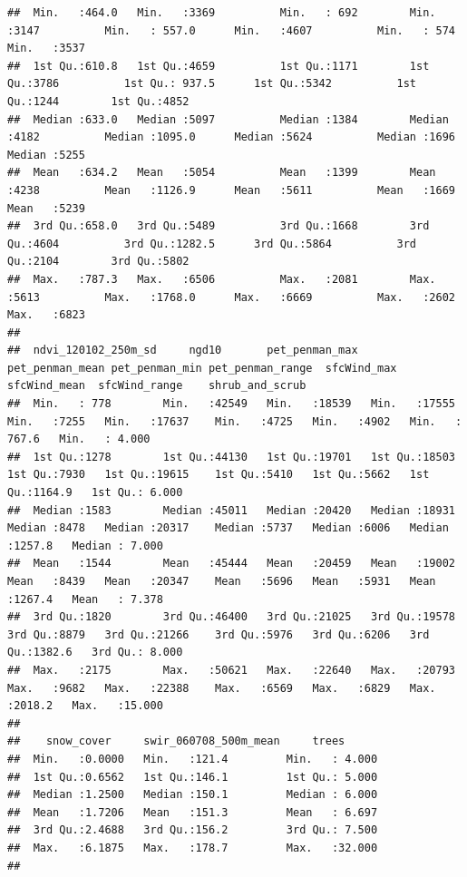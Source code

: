 \documentclass[
  10pt,
  b5paper,
  oneside]{book}
\begin{document}
\begin{verbatim}
##  Min.   :464.0   Min.   :3369          Min.   : 692        Min.   :3147          Min.   : 557.0      Min.   :4607          Min.   : 574        Min.   :3537         
##  1st Qu.:610.8   1st Qu.:4659          1st Qu.:1171        1st Qu.:3786          1st Qu.: 937.5      1st Qu.:5342          1st Qu.:1244        1st Qu.:4852         
##  Median :633.0   Median :5097          Median :1384        Median :4182          Median :1095.0      Median :5624          Median :1696        Median :5255         
##  Mean   :634.2   Mean   :5054          Mean   :1399        Mean   :4238          Mean   :1126.9      Mean   :5611          Mean   :1669        Mean   :5239         
##  3rd Qu.:658.0   3rd Qu.:5489          3rd Qu.:1668        3rd Qu.:4604          3rd Qu.:1282.5      3rd Qu.:5864          3rd Qu.:2104        3rd Qu.:5802         
##  Max.   :787.3   Max.   :6506          Max.   :2081        Max.   :5613          Max.   :1768.0      Max.   :6669          Max.   :2602        Max.   :6823         
##                                                                                                                                                                     
##  ndvi_120102_250m_sd     ngd10       pet_penman_max  pet_penman_mean pet_penman_min pet_penman_range  sfcWind_max    sfcWind_mean  sfcWind_range    shrub_and_scrub 
##  Min.   : 778        Min.   :42549   Min.   :18539   Min.   :17555   Min.   :7255   Min.   :17637    Min.   :4725   Min.   :4902   Min.   : 767.6   Min.   : 4.000  
##  1st Qu.:1278        1st Qu.:44130   1st Qu.:19701   1st Qu.:18503   1st Qu.:7930   1st Qu.:19615    1st Qu.:5410   1st Qu.:5662   1st Qu.:1164.9   1st Qu.: 6.000  
##  Median :1583        Median :45011   Median :20420   Median :18931   Median :8478   Median :20317    Median :5737   Median :6006   Median :1257.8   Median : 7.000  
##  Mean   :1544        Mean   :45444   Mean   :20459   Mean   :19002   Mean   :8439   Mean   :20347    Mean   :5696   Mean   :5931   Mean   :1267.4   Mean   : 7.378  
##  3rd Qu.:1820        3rd Qu.:46400   3rd Qu.:21025   3rd Qu.:19578   3rd Qu.:8879   3rd Qu.:21266    3rd Qu.:5976   3rd Qu.:6206   3rd Qu.:1382.6   3rd Qu.: 8.000  
##  Max.   :2175        Max.   :50621   Max.   :22640   Max.   :20793   Max.   :9682   Max.   :22388    Max.   :6569   Max.   :6829   Max.   :2018.2   Max.   :15.000  
##                                                                                                                                                                     
##    snow_cover     swir_060708_500m_mean     trees       
##  Min.   :0.0000   Min.   :121.4         Min.   : 4.000  
##  1st Qu.:0.6562   1st Qu.:146.1         1st Qu.: 5.000  
##  Median :1.2500   Median :150.1         Median : 6.000  
##  Mean   :1.7206   Mean   :151.3         Mean   : 6.697  
##  3rd Qu.:2.4688   3rd Qu.:156.2         3rd Qu.: 7.500  
##  Max.   :6.1875   Max.   :178.7         Max.   :32.000  
## 
\end{verbatim}
\end{document}

